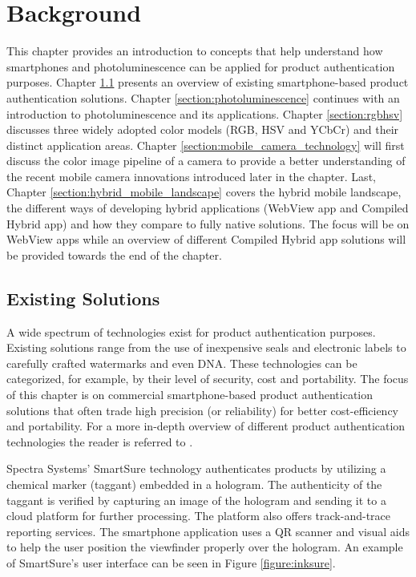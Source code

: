 \documentclass[thesis.tex]{subfiles}
\begin{document}
\chapter{Background}
\label{chapter:background}

This chapter provides an introduction to concepts that help understand how smartphones and photoluminescence can be applied for product authentication purposes. Chapter \ref{section:existing_solutions} presents an overview of existing smartphone-based product authentication solutions. Chapter \ref{section:photoluminescence} continues with an introduction to photoluminescence and its applications. Chapter \ref{section:rgbhsv} discusses three widely adopted color models (RGB, HSV and YCbCr) and their distinct application areas. Chapter \ref{section:mobile_camera_technology} will first discuss the color image pipeline of a camera to provide a better understanding of the recent mobile camera innovations introduced later in the chapter. Last, Chapter \ref{section:hybrid_mobile_landscape} covers the hybrid mobile landscape, the different ways of developing hybrid applications (WebView app and Compiled Hybrid app) and how they compare to fully native solutions. The focus will be on WebView apps while an overview of different Compiled Hybrid app solutions will be provided towards the end of the chapter.

\clearpage

\section{Existing Solutions}
\label{section:existing_solutions}

A wide spectrum of technologies exist for product authentication purposes. Existing solutions range from the use of inexpensive seals and electronic labels to carefully crafted watermarks and even DNA. These technologies can be categorized, for example, by their level of security, cost and portability. The focus of this chapter is on commercial smartphone-based product authentication solutions that often trade high precision (or reliability) for better cost-efficiency and portability. For a more in-depth overview of different product authentication technologies the reader is referred to \cite{kuosmanen}.

Spectra Systems' SmartSure technology authenticates products by utilizing a chemical marker (taggant) embedded in a hologram. The authenticity of the taggant is verified by capturing an image of the hologram and sending it to a cloud platform for further processing. The platform also offers track-and-trace reporting services. The smartphone application uses a QR scanner and visual aids to help the user position the viewfinder properly over the hologram. \cite{inksure} An example of SmartSure's user interface can be seen in Figure \ref{figure:inksure}.
\end{document}
